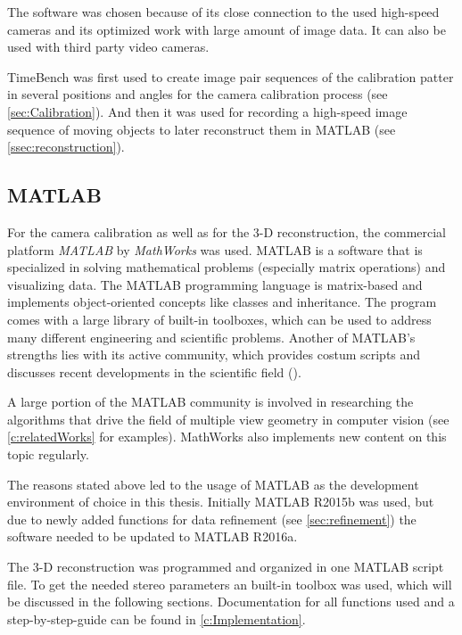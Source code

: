 The software was chosen because of its close connection to the used high-speed cameras and its optimized work with large amount of image data. It can also be used with third party video cameras.

TimeBench was first used to create image pair sequences of the calibration patter in several positions and angles for the camera calibration process (see \autoref{sec:Calibration}). And then it was used for recording a high-speed image sequence of moving objects to later reconstruct them in MATLAB (see \autoref{ssec:reconstruction}). 
\\

\subsection{MATLAB} \label{ssec:Matlab}
For the camera calibration as well as for the 3-D reconstruction, the commercial platform \textit{MATLAB} by \textit{MathWorks} was used. MATLAB is a software that is specialized in solving mathematical problems (especially matrix operations) and visualizing data. The MATLAB programming language is matrix-based and implements object-oriented concepts like classes and inheritance. The program comes with a large library of built-in toolboxes, which can be used to address many different engineering and scientific problems. Another of MATLAB's strengths lies with its active community, which provides costum scripts and discusses recent developments in the scientific field (\cite{MathWorks.2016}).

A large portion of the MATLAB community is involved in researching the algorithms that drive the field of multiple view geometry in computer vision (see \autoref{c:relatedWorks} for examples). MathWorks also implements new content on this topic regularly. 

The reasons stated above led to the usage of MATLAB as the development environment of choice in this thesis. Initially MATLAB R2015b was used, but due to newly added functions for data refinement (see \autoref{sec:refinement}) the software needed to be updated to MATLAB R2016a.
   
The 3-D reconstruction was programmed and organized in one MATLAB script file. To get the needed stereo parameters an built-in toolbox was used, which will be discussed in the following sections. Documentation for all functions used and a step-by-step-guide can be found in \autoref{c:Implementation}.

